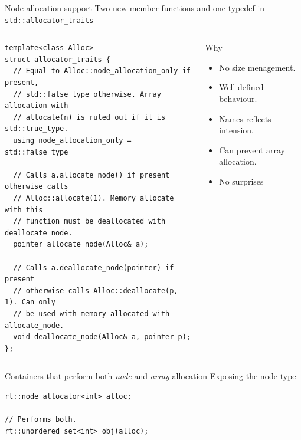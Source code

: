 \documentclass[10pt,aspectratio=169]{beamer}
\begin{document}
\begin{frame}[fragile]
{Node allocation support}
{Two new member functions and one typedef in \texttt{std::allocator\_traits}}

\begin{columns}
\begin{column}{0.60\textwidth}
\begin{lstlisting}
template<class Alloc>
struct allocator_traits {
  // Equal to Alloc::node_allocation_only if present,
  // std::false_type otherwise. Array allocation with
  // allocate(n) is ruled out if it is std::true_type.
  using node_allocation_only = std::false_type

  // Calls a.allocate_node() if present otherwise calls
  // Alloc::allocate(1). Memory allocate with this
  // function must be deallocated with deallocate_node.
  pointer allocate_node(Alloc& a);

  // Calls a.deallocate_node(pointer) if present
  // otherwise calls Alloc::deallocate(p, 1). Can only
  // be used with memory allocated with allocate_node.
  void deallocate_node(Alloc& a, pointer p);
};
\end{lstlisting}
\end{column}

\begin{column}{0.40\textwidth}
\begin{block}{Why}
\begin{itemize}
\item No size menagement.
\item Well defined behaviour.
\item Names reflects intension.
\item Can prevent array allocation.
\item {\color{alertc}No surprises}
\end{itemize}
\end{block}
\end{column}

\end{columns}

\end{frame}

\begin{frame}[fragile]
{Containers that perform both {\it node} and {\it array} allocation}
{Exposing the node type}

\begin{lstlisting}
rt::node_allocator<int> alloc;

// Performs both.
rt::unordered_set<int> obj(alloc);
\end{lstlisting}

\end{frame}
\end{document}
